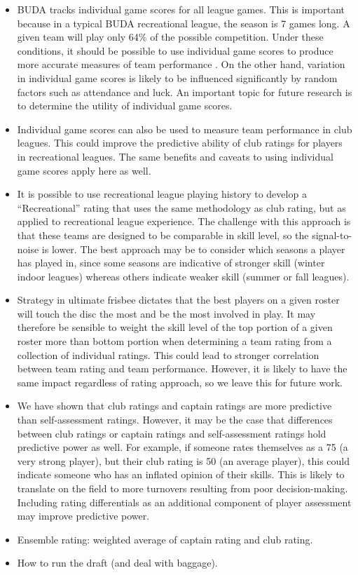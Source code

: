 \begin{itemize}

\item BUDA tracks individual game scores for all league games. This is important because in a typical BUDA recreational league, the season is 7 games long. A given team will play only 64\% of the possible competition. Under these conditions, it should be possible to use individual game scores to produce more accurate measures of team performance \cite{Langville_2012}. On the other hand, variation in individual game scores is likely to be influenced significantly by random factors such as attendance and luck. An important topic for future research is to determine the utility of individual game scores.

\item Individual game scores can also be used to measure team performance in club leagues. This could improve the predictive ability of club ratings for players in recreational leagues. The same benefits and caveats to using individual game scores apply here as well.

\item It is possible to use recreational league playing history to develop a ``Recreational'' rating that uses the same methodology as club rating, but as applied to recreational league experience. The challenge with this approach is that these teams are designed to be comparable in skill level, so the signal-to-noise is lower. The best approach may be to consider which seasons a player has played in, since some seasons are indicative of stronger skill (winter indoor leagues) whereas others indicate weaker skill (summer or fall leagues).

\item Strategy in ultimate frisbee dictates that the best players on a given roster will touch the disc the most and be the most involved in play.  It may therefore be sensible to weight the skill level of the top portion of a given roster more than bottom portion when determining a team rating from a collection of individual ratings. This could lead to stronger correlation between team rating and team performance. However, it is likely to have the same impact regardless of rating approach, so we leave this for future work.

\item We have shown that club ratings and captain ratings are more predictive than self-assessment ratings. However, it may be the case that differences between club ratings or captain ratings and self-assessment ratings hold predictive power as well. For example, if someone rates themselves as a 75 (a very strong player), but their club rating is 50 (an average player), this could indicate someone who has an inflated opinion of their skills. This is likely to translate on the field to more turnovers resulting from poor decision-making.  Including rating differentials as an additional component of player assessment may improve predictive power.

\item Ensemble rating: weighted average of captain rating and club rating.

\item How to run the draft (and deal with baggage).

\end{itemize}